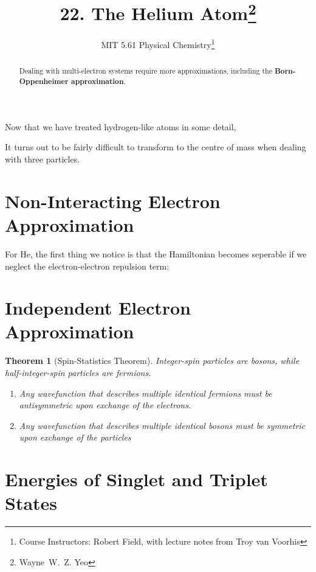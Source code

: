 \documentclass[a4paper]{tufte-handout}
\title{22. The Helium Atom\thanks{Wayne~W.~Z. Yeo}}
\author[MIT 5.61]{\textnormal{MIT 5.61} Physical Chemistry\thanks{Course Instructors: Robert Field, with lecture notes from Troy van Voorhis}}
\newtheorem{theorem}{Theorem}
\theoremstyle{definition}
\begin{document}
\maketitle%

\begin{abstract}
\noindent
Dealing with multi-electron systems require more approximations, including the \textbf{Born-Oppenheimer approximation}.

\end{abstract}

Now that we have treated hydrogen-like atoms in some detail,

It turns out to be fairly difficult to transform to the centre of mass when dealing with three particles.


\section{Non-Interacting Electron Approximation}

For He, the first thing we notice is that the Hamiltonian becomes seperable if we neglect the
electron-electron repulsion term:

\section{Independent Electron Approximation}

\begin{theorem}[Spin-Statistics Theorem] Integer-spin particles are bosons, while half-integer-spin particles are fermions.
  \begin{enumerate}
    \item Any wavefunction that describes multiple identical fermions must be antisymmetric upon exchange of the electrons.
    \item Any wavefunction that describes multiple identical bosons must be symmetric upon exchange of the particles
  \end{enumerate}
   
\end{theorem}

\section{Energies of Singlet and Triplet States}
\end{document}
